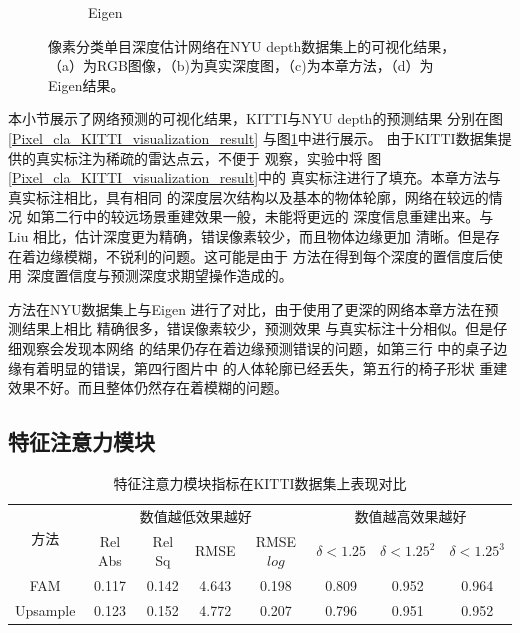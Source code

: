 \begin{figure}[htb]
\begin{subfigure}{0.24\linewidth}
\begin{minipage}[b]{1\linewidth}
  \end{minipage}
  \caption{Eigen\cite{eigen2014depth}}
  \end{subfigure}
  \caption{像素分类单目深度估计网络在NYU depth数据集上的可视化结果，
  （a）为RGB图像，（b)为真实深度图，（c)为本章方法，（d）为
  Eigen\cite{eigen2014depth}结果。}
  \label{Pixel_cla_nyu_visualization_result}
  \end{figure}
本小节展示了网络预测的可视化结果，KITTI与NYU depth的预测结果
分别在图\ref{Pixel_cla_KITTI_visualization_result}
与图\ref{Pixel_cla_nyu_visualization_result}中进行展示。
由于KITTI数据集提供的真实标注为稀疏的雷达点云，不便于
观察，实验中将
图\ref{Pixel_cla_KITTI_visualization_result}中的
真实标注进行了填充。本章方法与真实标注相比，具有相同
的深度层次结构以及基本的物体轮廓，网络在较远的情况
如第二行中的较远场景重建效果一般，未能将更远的
深度信息重建出来。与Liu\cite{liu2015learning}
相比，估计深度更为精确，错误像素较少，而且物体边缘更加
清晰。但是存在着边缘模糊，不锐利的问题。这可能是由于
方法在得到每个深度的置信度后使用
深度置信度与预测深度求期望操作造成的。

方法在NYU数据集上与Eigen\cite{eigen2014depth}
进行了对比，由于使用了更深的网络本章方法在预测结果上相比
\cite{eigen2014depth}精确很多，错误像素较少，预测效果
与真实标注十分相似。但是仔细观察会发现本网络
的结果仍存在着边缘预测错误的问题，如第三行
中的桌子边缘有着明显的错误，第四行图片中
的人体轮廓已经丢失，第五行的椅子形状
重建效果不好。而且整体仍然存在着模糊的问题。
\vspace{-0cm}

\subsection{特征注意力模块}
\begin{table}[htb]
  \centering
  \caption{特征注意力模块指标在KITTI数据集上表现对比}
  \label{tab:FAM quantitative result}
  \begin{tabular}{c|cccc|ccc}
    \toprule
    \multirow{2}{*}{方法} & \multicolumn{4}{c}{数值越低效果越好}&\multicolumn{3}{|c}{数值越高效果越好}\\
    & Rel Abs & Rel Sq & RMSE& RMSE $log$ &$\delta<1.25$ &$\delta<1.25^2$ & $\delta<1.25^3$ \\   
    \midrule            
    FAM&0.117&0.142&4.643&0.198&0.809&0.952&0.964\\
    Upsample&0.123&0.152&4.772&0.207&0.796&0.951&0.952\\
    \bottomrule
  \end{tabular}
\end{table}

